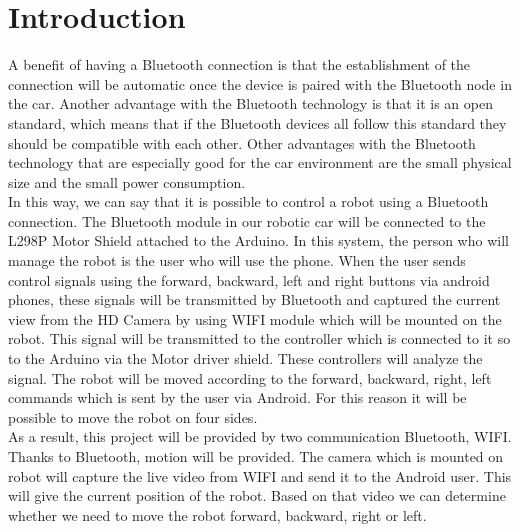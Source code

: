 \documentclass[11pt]{article}
\begin{document}
\section{Introduction}
\begin{flushleft}
A benefit of having a Bluetooth connection is that the establishment of the connection will be automatic once the device is paired with the Bluetooth node in the car. Another advantage with the Bluetooth technology is that it is an open standard, which means that if the Bluetooth devices all follow this standard they should be compatible with each other. Other advantages with the Bluetooth technology that are especially good for the car environment are the small
physical size and the small power consumption.\\
\vspace{0.2cm}
In this way, we can say that it is possible to control a robot using a Bluetooth connection. The Bluetooth module in our robotic car will be connected to the L298P Motor Shield attached to the Arduino. In this system, the person who will manage the robot is the user who will use the phone. When the user sends control signals using the forward, backward, left and right buttons via android phones, these signals will be transmitted by Bluetooth and captured the current view from the HD Camera by using WIFI module which will be mounted on the robot. This signal will be transmitted to the controller which is connected to it so to the Arduino via the Motor driver shield. These controllers will analyze the signal. The robot will be moved according to the forward, backward, right, left commands which is sent by the user via Android. For this reason it will be possible to move the robot on four sides.\\
\vspace{0.2cm}
As a result, this project will be provided by two communication Bluetooth, WIFI. Thanks to Bluetooth, motion will be provided. The camera which is mounted on robot will capture the live video from WIFI and send it to the Android user. This will give the current position of the robot. Based on that video we can determine whether we need to move the robot forward, backward, right or left.
\end{flushleft}

\pagebreak
\end{document}
